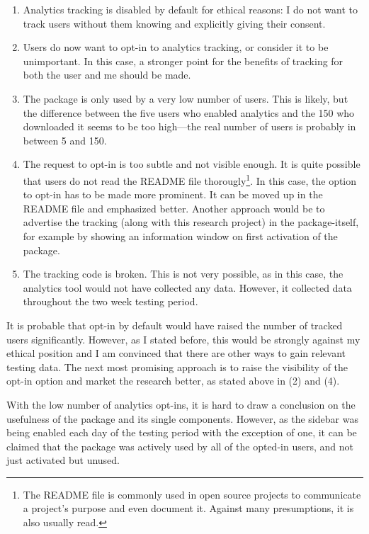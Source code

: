\begin{description}
\begin{enumerate}
\def\labelenumi{\arabic{enumi}.}
\itemsep1pt\parskip0pt
\item
  Analytics tracking is disabled by default for ethical reasons: I do
  not want to track users without them knowing and explicitly giving
  their consent.
\item
  Users do now want to opt-in to analytics tracking, or consider it to
  be unimportant. In this case, a stronger point for the benefits of
  tracking for both the user and me should be made.
\item
  The package is only used by a very low number of users. This is
  likely, but the difference between the five users who enabled
  analytics and the 150 who downloaded it seems to be too high—the real
  number of users is probably in between 5 and 150.
\item
  The request to opt-in is too subtle and not visible enough. It is
  quite possible that users do not read the README file
  thorougly\footnote{The README file is commonly used in open source projects to communicate a project’s purpose and even document it. Against many presumptions, it is also usually read.}.
  In this case, the option to opt-in has to be made more prominent. It
  can be moved up in the README file and emphasized better. Another
  approach would be to advertise the tracking (along with this research
  project) in the package-itself, for example by showing an information
  window on first activation of the package.
\item
  The tracking code is broken. This is not very possible, as in this
  case, the analytics tool would not have collected any data. However,
  it collected data throughout the two week testing period.
\end{enumerate}

It is probable that opt-in by default would have raised the number of
tracked users significantly. However, as I stated before, this would be
strongly against my ethical position and I am convinced that there are
other ways to gain relevant testing data. The next most promising
approach is to raise the visibility of the opt-in option and market the
research better, as stated above in (2) and (4).

With the low number of analytics opt-ins, it is hard to draw a
conclusion on the usefulness of the package and its single components.
However, as the sidebar was being enabled each day of the testing period
with the exception of one, it can be claimed that the package was
actively used by all of the opted-in users, and not just activated but
unused.
\end{description}

